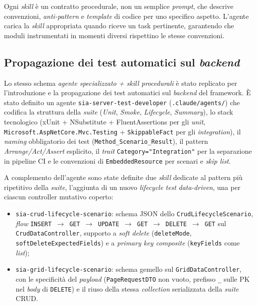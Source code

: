 Ogni \emph{skill} è un contratto procedurale, non un semplice \emph{prompt}, che descrive
convenzioni, \emph{anti-pattern} e \emph{template} di codice per uno specifico aspetto. L'agente
carica la \emph{skill} appropriata quando riceve un task pertinente, garantendo che
moduli instrumentati in momenti diversi rispettino le stesse convenzioni.

\subsection{Propagazione dei test automatici sul \emph{backend}}

Lo stesso schema \emph{agente specializzato + skill procedurali} è stato replicato per
l'introduzione e la propagazione dei test automatici sul \emph{backend} del framework. È
stato definito un agente \texttt{sia-server-test-developer} (\texttt{.claude/agents/}) che
codifica la struttura della \emph{suite} (\emph{Unit}, \emph{Smoke}, \emph{Lifecycle},
\emph{Summary}), lo stack tecnologico (xUnit + NSubstitute + FluentAssertions per gli
\emph{unit}, \texttt{Microsoft.AspNetCore.Mvc.Testing} + \texttt{SkippableFact} per gli
\emph{integration}), il \emph{naming} obbligatorio dei test
(\texttt{Method\_Scenario\_Result}), il pattern \emph{Arrange/Act/Assert} esplicito, il
\emph{trait} \texttt{Category="Integration"} per la separazione in pipeline CI e le
convenzioni di \texttt{EmbeddedResource} per scenari e \emph{skip list}.

A complemento dell'agente sono state definite due \emph{skill} dedicate al pattern più
ripetitivo della \emph{suite}, l'aggiunta di un nuovo \emph{lifecycle test}
\emph{data-driven}, una per ciascun controller mutativo coperto:
\begin{itemize}
    \item \texttt{sia-crud-lifecycle-scenario}: schema JSON dello \texttt{CrudLifecycleScenario},
        \emph{flow} \texttt{INSERT $\rightarrow$ GET $\rightarrow$ UPDATE $\rightarrow$ GET $\rightarrow$ DELETE $\rightarrow$ GET}
        sul \texttt{CrudDataController}, supporto a \emph{soft delete}
        (\texttt{deleteMode}, \texttt{softDeleteExpectedFields}) e a \emph{primary key
        composite} (\texttt{keyFields} come \emph{list});
    \item \texttt{sia-grid-lifecycle-scenario}: schema gemello sul \texttt{GridDataController},
        con le specificità del \emph{payload} (\texttt{PageRequestDTO} non vuoto, prefisso
        \texttt{\_} sulle PK nel \emph{body} di \texttt{DELETE}) e il riuso della stessa
        \emph{collection} serializzata della \emph{suite} CRUD.
\end{itemize}

